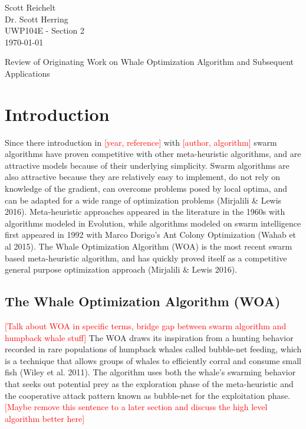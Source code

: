 \documentclass[11pt]{article}
\newcommand{\TODO}[1]{\textcolor{red}{[#1]}}
\begin{document}
    \thispagestyle{empty}
    \begin{flushleft}
        Scott Reichelt\\
        Dr. Scott Herring\\
        UWP104E - Section 2\\
        \today\\
    \end{flushleft}
    \vspace{1em}
    \begin{center}
        Review of Originating Work on Whale Optimization Algorithm and Subsequent Applications
    \end{center}

\section*{Introduction}
Since there introduction in \TODO{year, reference} with \TODO{author, algorithm} swarm algorithms have proven competitive with other meta-heuristic algorithms, and are attractive models because of their underlying simplicity.
Swarm algorithms are also attractive because they are relatively easy to implement, do not rely on knowledge of the gradient, can overcome problems posed by local optima, and can be adapted for a wide range of optimization problems (Mirjalili \& Lewis 2016).
Meta-heuristic approaches appeared in the literature in the 1960s with algorithms modeled in Evolution, while algorithms modeled on swarm intelligence first appeared in 1992 with Marco Dorigo's Ant Colony Optimization (Wahab et al 2015).
The Whale Optimization Algorithm (WOA) is the most recent swarm based meta-heuristic algorithm, and has quickly proved itself as a competitive general purpose optimization approach (Mirjalili \& Lewis 2016).

\subsection*{The Whale Optimization Algorithm (WOA)}
\TODO{Talk about WOA in specific terms, bridge gap between swarm algorithm and humpback whale stuff}
The WOA draws its inspiration from a hunting behavior recorded in rare populations of humpback whales called bubble-net feeding, which is a technique that allows groups of whales to efficiently corral and consume small fish (Wiley et al. 2011).
The algorithm uses both the whale's swarming behavior that seeks out potential prey as the exploration phase of the meta-heuristic and the cooperative attack pattern known as bubble-net for the exploitation phase.
\TODO{Maybe remove this sentence to a later section and discuss the high level algorithm better here}
\end{document}
